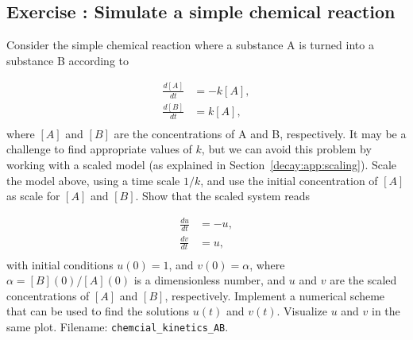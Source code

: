 \documentclass[graybox,sectrefs,envcountresetchap,open=right,final]{svmonodo}
\newenvironment{doconceexercise}{}{}
\newcounter{doconceexercisecounter}
\begin{document}
\begin{doconceexercise}

\subsection*{Exercise \thedoconceexercisecounter: Simulate a simple chemical reaction}

\label{decay:app:exer:kinetics:AB}

Consider the simple chemical reaction where a substance A is turned
into a substance B according to

\begin{align*}
\frac{d[A]}{dt} &= -k[A],\\ 
\frac{d[B]}{dt} &= k[A],\\ 
\end{align*}
where $[A]$ and $[B]$ are the concentrations of A and B, respectively.
It may be a challenge to find appropriate values of $k$, but we can avoid
this problem by working with a scaled model (as explained in
Section~\ref{decay:app:scaling}).
Scale the model above, using a time scale $1/k$, and use
the initial concentration
of $[A]$ as scale for $[A]$ and $[B]$. Show that the scaled system
reads

\begin{align*}
\frac{du}{dt} &= -u,\\ 
\frac{dv}{dt} &= u,\\ 
\end{align*}
with initial conditions $u(0)=1$, and $v(0)=\alpha$, where
$\alpha = [B](0)/[A](0)$ is a dimensionless number, and
$u$ and $v$ are the scaled concentrations of $[A]$ and $[B]$,
respectively. Implement a numerical scheme that can be used to
find the solutions
$u(t)$ and $v(t)$. Visualize $u$ and $v$ in the same plot.
\noindent Filename: \Verb!chemcial_kinetics_AB!.

\end{doconceexercise}
\end{document}
